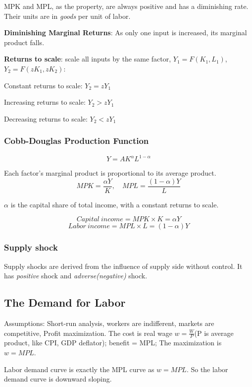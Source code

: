 \documentclass[10pt, a4paper]{article}
\begin{document}
            MPK and MPL, as the property, are always positive and has a diminishing rate. Their units are in \emph{goods} per unit of labor.  

            \textbf{Diminishing Marginal Returns}: As only one input is increased, its marginal product falls.

            \textbf{Returns to scale}: scale all inputs by the same factor, $Y_1 = F(K_1, L_1)$, $Y_2 = F(zK_1, zK_2)$: 

            {Constant returns to scale}: $Y_2 = zY_1$
            
            {Increasing returns to scale}: $Y_2 > zY_1$

            {Decreasing returns to scale}: $Y_2 < zY_1$
            
            \subsubsection{Cobb-Douglas Production Function} 
            $$Y = AK^{\alpha}L^{1 - \alpha}$$

            Each factor's marginal product is proportional to its average product. 
            $$MPK = \frac{\alpha Y}{K}, \quad MPL = \frac{(1 - \alpha) Y}{L}$$

            $\alpha$ is the capital share of total income, with a constant returns to scale.

            $$Capital\ income = MPK \times K = \alpha Y$$
            $$Labor\ income = MPL \times L = (1 - \alpha)Y$$

            \subsubsection{Supply shock}
                Supply shocks are derived from the influence of supply side without control. It has \emph{positive} shock and \emph{adverse(negative)} shock.

        \subsection{The Demand for Labor}
            Assumptions: Short-run analysis, workers are indifferent, markets are competitive, Profit maximization. The cost is real wage $w = \frac{W}{P}$(P is average product, like CPI, GDP deflator); benefit = MPL; The maximization is $w = MPL$.

            Labor demand curve is exactly the MPL curve as $w = MPL$. So the labor demand curve is downward sloping. 
\end{document}
